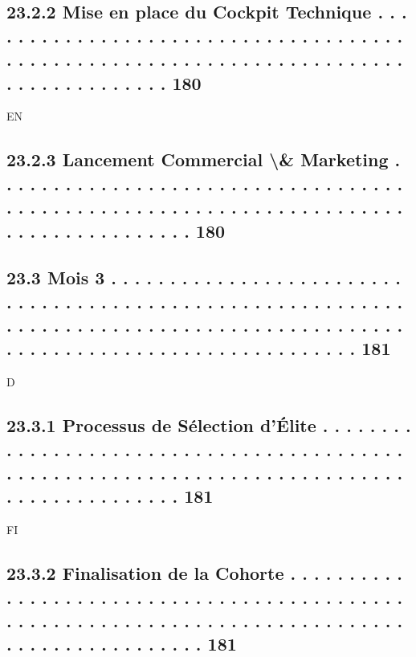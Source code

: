 \documentclass[12pt,landscape,a4paper]{article}
\begin{document}
\subsection{23.2.2               Mise en place du Cockpit Technique . . . . . . . . . . . . . . . . . . . . . . . . . . . . . . . . . . . . . . . . . . . . . . . . . . . . . . . . . . . . . . . . . . . . . . . . . . . . . . . . . . . . . 180}
\vspace{0.5em}
\vspace{0.5em}
\vspace{0.5em}
\vspace{0.5em}
EN\\
\subsection{23.2.3               Lancement Commercial \textbackslash{}& Marketing . . . . . . . . . . . . . . . . . . . . . . . . . . . . . . . . . . . . . . . . . . . . . . . . . . . . . . . . . . . . . . . . . . . . . . . . . . . . . . . . . . . . . 180}
\subsection{23.3    Mois 3 . . . . . . . . . . . . . . . . . . . . . . . . . . . . . . . . . . . . . . . . . . . . . . . . . . . . . . . . . . . . . . . . . . . . . . . . . . . . . . . . . . . . . . . . . . . . . . . . . . . . . . . . . . . . . . . . . . . . . . . . . . . 181}
\vspace{0.5em}
\vspace{0.5em}
\vspace{0.5em}
\vspace{0.5em}
D\\
\subsection{23.3.1               Processus de Sélection d’Élite . . . . . . . . . . . . . . . . . . . . . . . . . . . . . . . . . . . . . . . . . . . . . . . . . . . . . . . . . . . . . . . . . . . . . . . . . . . . . . . . . . . . . . . . . . . 181}
\vspace{0.5em}
\vspace{0.5em}
\vspace{0.5em}
\vspace{0.5em}
FI\\
\subsection{23.3.2               Finalisation de la Cohorte . . . . . . . . . . . . . . . . . . . . . . . . . . . . . . . . . . . . . . . . . . . . . . . . . . . . . . . . . . . . . . . . . . . . . . . . . . . . . . . . . . . . . . . . . . . . . . . 181}
\end{document}
